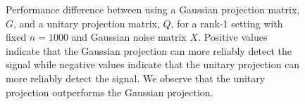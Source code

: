 \begin{figure}
\begin{center}
  \caption{Performance difference between using a Gaussian projection matrix, $G$, and a
    unitary projection matrix, $Q$, for a rank-1 setting with fixed $n=1000$ and Gaussian
    noise matrix $X$. Positive values indicate that the Gaussian projection can more
    reliably detect the signal while negative values indicate that the unitary projection
    can more reliably detect the signal. We observe that the unitary projection
    outperforms the Gaussian projection.}
  \label{fig:chpt7:comparison}
\end{center}
\end{figure}


